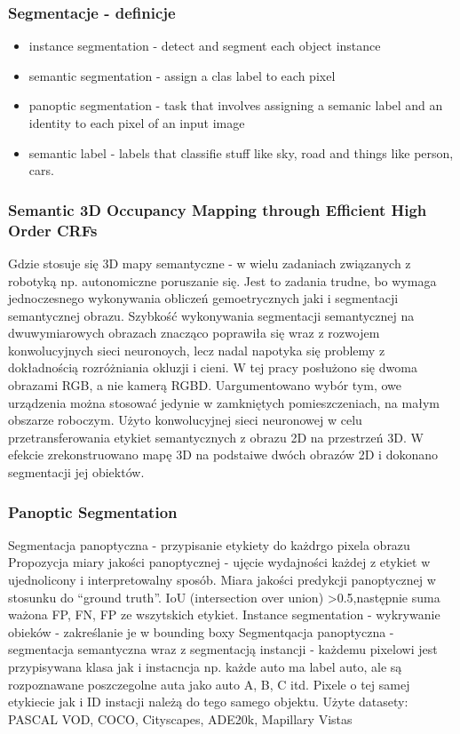 \documentclass[
]{article}
\providecommand{\tightlist}{%
  \setlength{\itemsep}{0pt}\setlength{\parskip}{0pt}}
\begin{document}
\subsubsection{Segmentacje - definicje}\label{segmentacje---definicje}

\begin{itemize}
\tightlist
\item
  instance segmentation - detect and segment each object instance
\item
  semantic segmentation - assign a clas label to each pixel
\item
  panoptic segmentation - task that involves assigning a semanic label and an identity to each pixel of an input image
\item
  semantic label - labels that classifie stuff like sky, road and things like person, cars.
\end{itemize}

\subsubsection{Semantic 3D Occupancy Mapping through Efficient High Order CRFs}\label{semantic-3d-occupancy-mapping-through-efficient-high-order-crfs}

Gdzie stosuje się 3D mapy semantyczne - w wielu zadaniach związanych z robotyką np. autonomiczne poruszanie się. Jest to zadania trudne, bo wymaga jednoczesnego wykonywania obliczeń gemoetrycznych jaki i segmentacji semantycznej obrazu. Szybkość wykonywania segmentacji semantycznej na dwuwymiarowych obrazach znacząco poprawiła się wraz z rozwojem konwolucyjnych sieci neuronoych, lecz nadal napotyka się problemy z dokładnością rozróżniania okluzji i cieni.
W tej pracy posłużono się dwoma obrazami RGB, a nie kamerą RGBD. Uargumentowano wybór tym, owe urządzenia można stosować jedynie w zamkniętych pomieszczeniach, na małym obszarze roboczym. Użyto konwolucyjnej sieci neuronowej w celu przetransferowania etykiet semantycznych z obrazu 2D na przestrzeń 3D. W efekcie zrekonstruowano mapę 3D na podstaiwe dwóch obrazów 2D i dokonano segmentacji jej obiektów.

\subsubsection{Panoptic Segmentation}\label{panoptic-segmentation}

Segmentacja panoptyczna - przypisanie etykiety do każdrgo pixela obrazu
Propozycja miary jakości panoptycznej - ujęcie wydajności każdej z etykiet w ujednolicony i interpretowalny sposób. Miara jakości predykcji panoptycznej w stosunku do ``ground truth''. IoU (intersection over union) \textgreater0.5,następnie suma ważona FP, FN, FP ze wszytskich etykiet.
Instance segmentation - wykrywanie obieków - zakreślanie je w bounding boxy
Segmentqacja panoptyczna - segmentacja semantyczna wraz z segmentacją instancji - każdemu pixelowi jest przypisywana klasa jak i instacncja np. każde auto ma label auto, ale są rozpoznawane poszczegolne auta jako auto A, B, C itd. Pixele o tej samej etykiecie jak i ID instacji należą do tego samego objektu.
Użyte datasety: PASCAL VOD, COCO, Cityscapes, ADE20k, Mapillary Vistas
\end{document}
